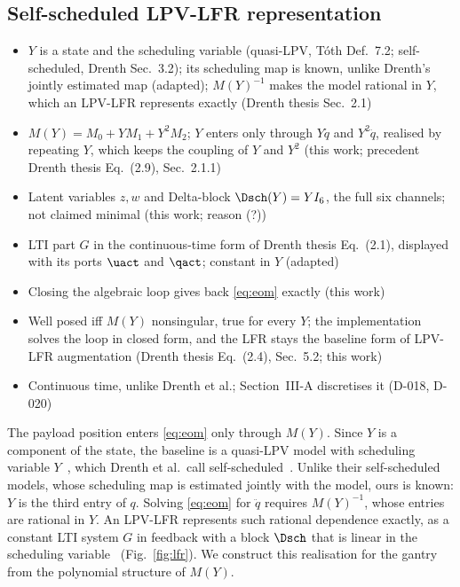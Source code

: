 \subsection{Self-scheduled LPV-LFR representation}\label{sec:lfr}
\ifdraft
\begin{itemize}
\item $Y$ is a state and the scheduling variable (quasi-LPV, T\'oth Def.~7.2; self-scheduled, Drenth Sec.~3.2); its scheduling map is known, unlike Drenth's jointly estimated map (adapted); $M(Y)^{-1}$ makes the model rational in $Y$, which an LPV-LFR represents exactly (Drenth thesis Sec.~2.1)
\item $M(Y)=M_0+YM_1+Y^2M_2$; $Y$ enters only through $Y\ddot q$ and $Y^2\ddot q$, realised by repeating $Y$, which keeps the coupling of $Y$ and $Y^2$ (this work; precedent Drenth thesis Eq.~(2.9), Sec.~2.1.1)
\item Latent variables $z,w$ and Delta-block $\Dsch(Y)=YI_6$, the full six channels; not claimed minimal (this work; reason (?))
\item LTI part $G$ in the continuous-time form of Drenth thesis Eq.~(2.1), displayed with its ports $\uact$ and $\qact$; constant in $Y$ (adapted)
\item Closing the algebraic loop gives back \eqref{eq:eom} exactly (this work)
\item Well posed iff $M(Y)$ nonsingular, true for every $Y$; the implementation solves the loop in closed form, and the LFR stays the baseline form of LPV-LFR augmentation (Drenth thesis Eq.~(2.4), Sec.~5.2; this work)
\item Continuous time, unlike Drenth et al.; Section~III-A discretises it (D-018, D-020)
\end{itemize}
\fi
The payload position enters \eqref{eq:eom} only through $M(Y)$.
Since $Y$ is a component of the state, the baseline is a quasi-LPV model
with scheduling variable
$Y$~\cite[Def.~7.2]{toth2010modeling}, which Drenth et al.\ call
self-scheduled~\cite[Sec.~3.2]{drenth2025lpvlfr}.
Unlike their self-scheduled models, whose scheduling map is estimated jointly
with the model, ours is known: $Y$ is the
third entry of $q$.
Solving \eqref{eq:eom} for $\ddot q$ requires $M(Y)^{-1}$, whose entries are
rational in $Y$.
An LPV-LFR represents such rational dependence exactly, as a constant LTI
system $G$ in feedback with a block $\Dsch$ that is linear in the scheduling
variable~\cite[Sec.~2.1]{drenth2025thesis} (Fig.~\ref{fig:lfr}).
We construct this realisation for the gantry from the polynomial structure of
$M(Y)$.

